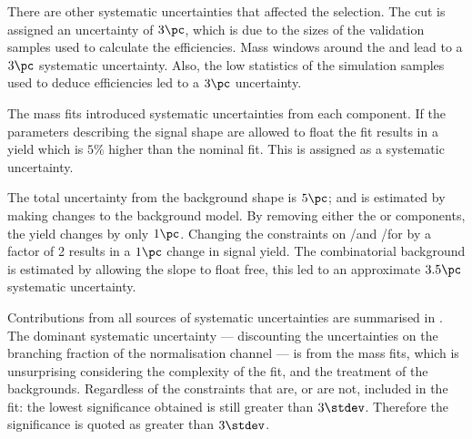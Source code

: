 There are other systematic uncertainties that affected the selection.
The \bdt cut is assigned an uncertainty of $3\pc$, which is due to the sizes of the
validation samples used to calculate the efficiencies.
Mass windows around the \Ds and \phii lead to a $3\pc$ systematic uncertainty.
Also, the low statistics of the simulation samples used to deduce efficiencies led to a $3\pc$
uncertainty.

The mass fits introduced systematic uncertainties from each component.
If the parameters describing the signal shape are allowed to float the fit results in a yield which is
$5\%$ higher than the nominal fit.
This is assigned as a systematic uncertainty.


The total uncertainty from the background shape is $5\pc$; and is estimated by making changes to
the background model.
By removing either the \btodsstrphi or \bstodsstrkstrk components, the yield changes by only $1\pc$.
Changing the constraints on \rA/\rB and \rC/\rD for \bstodskstrk by a factor of 2 results in a
$1\pc$ change in signal yield.
The combinatorial background is estimated by allowing the slope to float free, this led to an
approximate $3.5\pc$ systematic uncertainty.


Contributions from all sources of systematic uncertainties are summarised in .
The dominant systematic uncertainty --- discounting the uncertainties on the branching fraction of
the normalisation channel --- is from the mass fits, which is unsurprising considering the
complexity of the fit, and the treatment of the backgrounds.
Regardless of the constraints that are, or are not, included in the fit: the lowest
significance obtained is still greater than $3\stdev$.
Therefore the significance is quoted as greater than $3\stdev$.

